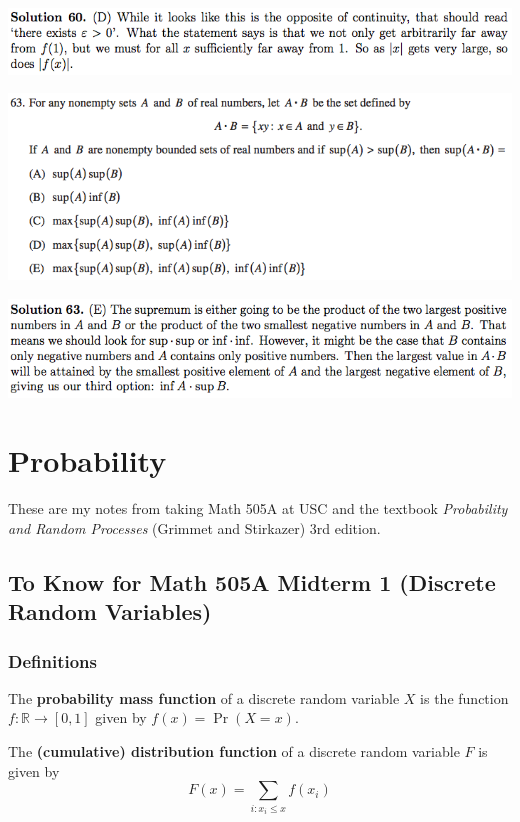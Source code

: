 \documentclass{article}
\begin{document}
\includegraphics[scale=0.65]{1268_60s}

\includegraphics[scale=0.65]{1268_63}

\includegraphics[scale=0.65]{1268_63s}

\pagebreak


\section{Probability}

These are my notes from taking Math 505A at USC and the textbook \textit{Probability and Random Processes} (Grimmet and Stirkazer) 3rd edition.

\subsection{To Know for Math 505A Midterm 1 (Discrete Random Variables)}

\subsubsection{Definitions}

The \textbf{probability mass function} of a discrete random variable \(X\) is the function \(f: \mathbb{R} \to [0,1]\) given by \(f(x) = \Pr(X = x)\).

The \textbf{(cumulative) distribution function} of a discrete random variable \(F\) is given by \[F(x) = \sum_{i:x_i \leq x} f(x_i)\]
\end{document}

